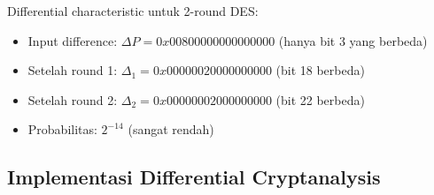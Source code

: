 \begin{contoh}
Differential characteristic untuk 2-round DES:
\begin{itemize}
  \item Input difference: $\Delta P = 0x00800000000000000$ (hanya bit 3 yang berbeda)
  \item Setelah round 1: $\Delta_1 = 0x00000020000000000$ (bit 18 berbeda)
  \item Setelah round 2: $\Delta_2 = 0x00000002000000000$ (bit 22 berbeda)
  \item Probabilitas: $2^{-14}$ (sangat rendah)
\end{itemize}
\end{contoh}

\subsection{Implementasi Differential Cryptanalysis}

